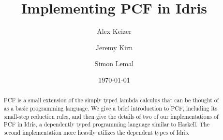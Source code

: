 \documentclass[12pt,a4paper]{article}
\title{Implementing PCF in Idris}
\author{Alex Keizer \and Jeremy Kirn \and Simon Lemal}
\date{\today}
\begin{document}
\maketitle

\begin{abstract}
PCF is a small extension of the simply typed lambda calculus that can be thought of as a basic programming language. We give a brief introduction to PCF, including its small-step reduction rules, and then give the details of two of our implementations of PCF in Idris, a dependently typed programming language similar to Haskell. The second implementation more heavily utilizes the dependent types of Idris.

\end{abstract}


\setcounter{tocdepth}{2}
\tableofcontents











\end{document}
